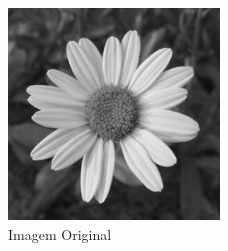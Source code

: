 \documentclass[a4paper]{report}
\begin{document}
\begin{figure}[H]
    \centering
    \includegraphics[width=0.5\textwidth]{images/flower.jpg}
    \caption{Imagem Original}
\end{figure}
\end{document}
